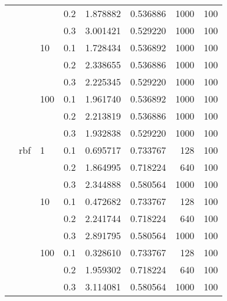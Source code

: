 \begin{table}[H]
\begin{tabular}{llllrrrr}
         &     &     & 0.2 &  1.878882 &  0.536886 &    1000 &   100 \\
         &     &     & 0.3 &  3.001421 &  0.529220 &    1000 &   100 \\
         &     & 10  & 0.1 &  1.728434 &  0.536892 &    1000 &   100 \\
         &     &     & 0.2 &  2.338655 &  0.536886 &    1000 &   100 \\
         &     &     & 0.3 &  2.225345 &  0.529220 &    1000 &   100 \\
         &     & 100 & 0.1 &  1.961740 &  0.536892 &    1000 &   100 \\
         &     &     & 0.2 &  2.213819 &  0.536886 &    1000 &   100 \\
         &     &     & 0.3 &  1.932838 &  0.529220 &    1000 &   100 \\
         & rbf & 1   & 0.1 &  0.695717 &  0.733767 &     128 &   100 \\
         &     &     & 0.2 &  1.864995 &  0.718224 &     640 &   100 \\
         &     &     & 0.3 &  2.344888 &  0.580564 &    1000 &   100 \\
         &     & 10  & 0.1 &  0.472682 &  0.733767 &     128 &   100 \\
         &     &     & 0.2 &  2.241744 &  0.718224 &     640 &   100 \\
         &     &     & 0.3 &  2.891795 &  0.580564 &    1000 &   100 \\
         &     & 100 & 0.1 &  0.328610 &  0.733767 &     128 &   100 \\
         &     &     & 0.2 &  1.959302 &  0.718224 &     640 &   100 \\
         &     &     & 0.3 &  3.114081 &  0.580564 &    1000 &   100 \\
\bottomrule
\end{tabular}
\end{table}
